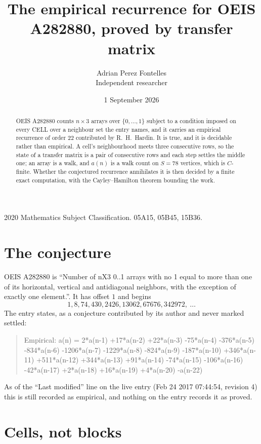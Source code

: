 \documentclass[11pt,a4paper]{article}
\title{The empirical recurrence for OEIS A282880, proved by transfer matrix}
\author{Adrian Perez Fontelles\\ \small Independent researcher}
\date{1 September 2026}
\theoremstyle{plain}
\theoremstyle{definition}
\begin{document}
\maketitle

\begin{abstract}
OEIS A282880 counts $n\times3$ arrays over $\{0,\dots,1\}$ subject to a condition imposed on
every CELL over a neighbour set the entry names, and it carries an empirical recurrence of
order $22$ contributed by R.~H.~Hardin. It is true, and it is decidable rather than
empirical. A cell's neighbourhood meets three consecutive rows, so the state of a transfer
matrix is a pair of consecutive rows and each step settles the middle one; an array is a
walk, and $a(n)$ is a walk count on $S=78$ vertices, which is $C$-finite. Whether the
conjectured recurrence annihilates it is then decided by a finite exact computation, with the
Cayley--Hamilton theorem bounding the work.
\end{abstract}

\noindent\small 2020 Mathematics Subject Classification. 05A15, 05B45, 15B36.\normalsize

\section{The conjecture}

OEIS A282880 is ``Number of nX3 0..1 arrays with no 1 equal to more than one of its horizontal, vertical and antidiagonal neighbors, with the exception of exactly one element.''. It has offset $1$ and begins
\[
1, 8, 74, 430, 2426, 13062, 67676, 342972,\ \dots
\]
The entry states, as a conjecture contributed by its author and never marked settled:
\begin{quote}
Empirical: a(n) = 2*a(n-1) +17*a(n-2) +22*a(n-3) -75*a(n-4) -376*a(n-5) -834*a(n-6) -1206*a(n-7) -1229*a(n-8) -824*a(n-9) -187*a(n-10) +346*a(n-11) +511*a(n-12) +344*a(n-13) +91*a(n-14) -74*a(n-15) -106*a(n-16) -42*a(n-17) +2*a(n-18) +16*a(n-19) +4*a(n-20) -a(n-22)
\end{quote}
As of the ``Last modified'' line on the live entry (Feb 24 2017 07:44:54, revision 4) this is still
recorded as empirical, and nothing on the entry records it as proved.

\section{Cells, not blocks}
\end{document}
